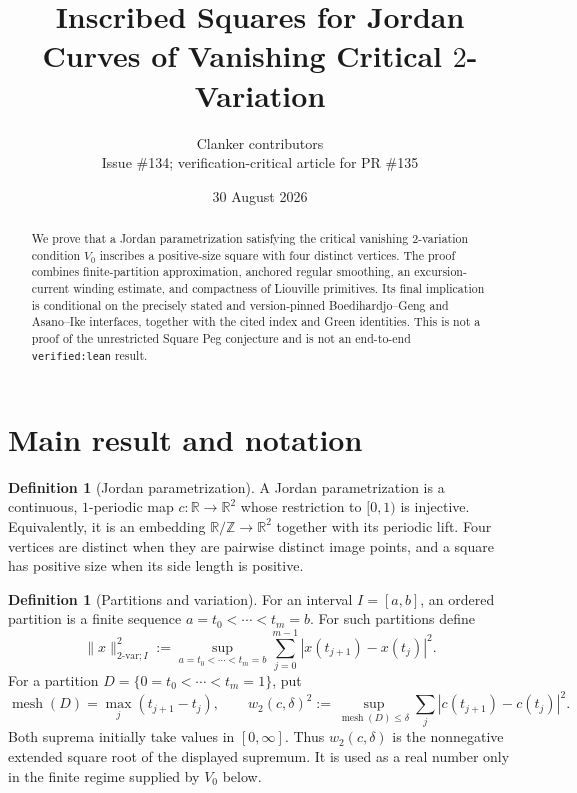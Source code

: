 \documentclass[11pt]{article}
\title{Inscribed Squares for Jordan Curves of Vanishing Critical
  $2$-Variation}
\author{Clanker contributors\\
\small Issue \#134; verification-critical article for PR \#135}
\date{30 August 2026}
\theoremstyle{definition}
\newtheorem{definition}[theorem]{Definition}
\theoremstyle{remark}
\newcommand{\R}{\mathbb R}
\newcommand{\T}{\mathbb R/\mathbb Z}
\newcommand{\mesh}{\operatorname{mesh}}
\begin{document}
\maketitle

\begin{abstract}
We prove that a Jordan parametrization satisfying the critical vanishing
$2$-variation condition $V_0$ inscribes a positive-size square with four
distinct vertices.  The proof combines finite-partition approximation,
anchored regular smoothing, an excursion-current winding estimate, and
compactness of Liouville primitives.  Its final implication is conditional
on the precisely stated and version-pinned Boedihardjo--Geng and
Asano--Ike interfaces, together with the cited index and Green identities.
This is not a proof of the unrestricted Square Peg conjecture and is not an
end-to-end \texttt{verified:lean} result.
\end{abstract}

\begin{center}
\end{center}

\section{Main result and notation}

\begin{definition}[Jordan parametrization]
A Jordan parametrization is a continuous, $1$-periodic map
$c\colon\R\to\R^2$ whose restriction to $[0,1)$ is injective.  Equivalently,
it is an embedding $\T\to\R^2$ together with its periodic lift.  Four
vertices are distinct when they are pairwise distinct image points, and a
square has positive size when its side length is positive.
\end{definition}

\begin{definition}[Partitions and variation]
For an interval $I=[a,b]$, an ordered partition is a finite sequence
$a=t_0<\cdots<t_m=b$.  For such partitions define
\[
 \|x\|_{2\text{-var};I}^2
 :=\sup_{a=t_0<\cdots<t_m=b}
       \sum_{j=0}^{m-1}|x(t_{j+1})-x(t_j)|^2.
\]
For a partition $D=\{0=t_0<\cdots<t_m=1\}$, put
\[
 \mesh(D)=\max_j(t_{j+1}-t_j),\qquad
w_2(c,\delta)^2
 :=\sup_{\mesh(D)\leq\delta}
       \sum_j|c(t_{j+1})-c(t_j)|^2.
\]
Both suprema initially take values in $[0,\infty]$.
Thus $w_2(c,\delta)$ is the nonnegative extended square root of the displayed
supremum.  It is used as a real number only in the finite regime supplied by
$V_0$ below.
\end{definition}
\end{document}
